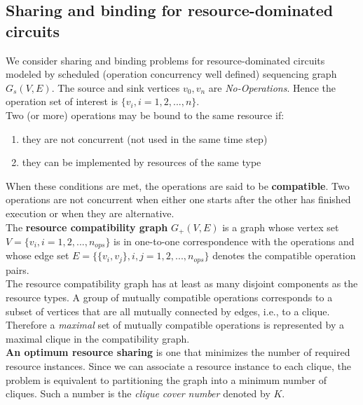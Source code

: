 \subsection{Sharing and binding for resource-dominated circuits}
We consider sharing and binding problems for resource-dominated circuits modeled by scheduled (operation concurrency well defined) sequencing graph $ G_s(V,E) $. The source and sink vertices  $ v_0,v_n $  are \textit{No-Operations}. Hence the operation set of interest is $ \lbrace v_i,i=1,2,...,n \rbrace $.\\
Two (or more) operations may be bound to the same resource if:
\begin{enumerate}
\item they are not concurrent (not used in the same time step)
\item they can  be  implemented by resources of the same type
\end{enumerate}
When these conditions are met, the operations are said to be  \textbf{compatible}.  Two operations are not concurrent when either one starts after the other has finished execution or when they are alternative.
\bigskip \\
The \textbf{resource compatibility graph} $ G_{+}(V,E) $ is a graph whose vertex set $ V = \lbrace v_i,i=1,2,...,n_{ops} \rbrace $ is in one-to-one correspondence  with  the operations and 	whose edge set $ E = \lbrace \lbrace v_i, v_j \rbrace ,i,j=1,2,...,n_{ops} \rbrace $ denotes the compatible operation pairs.
\bigskip \\
The resource compatibility graph has at least as many disjoint components as the resource types. A group of mutually compatible operations corresponds to a subset of vertices that are all mutually connected by edges, i.e., to a clique. Therefore a \textit{maximal}  set of mutually compatible operations is represented by a  maximal clique  in the compatibility graph.\\
\textbf{An  optimum resource sharing} is one that minimizes the number of required resource instances. Since we can associate a resource instance to each clique, the problem is equivalent to partitioning the graph into a minimum number of cliques. Such a number is the  \textit{clique cover number} denoted by $ K $.

